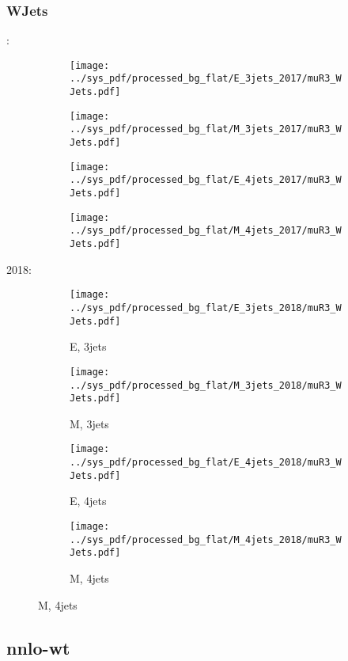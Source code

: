 \documentclass{beamer}
\begin{document}
\begin{frame}
\frametitle{WJets}
\fontsize{5}{1}:
\begin{figure}
\centering
\begin{subfigure}[b]{0.24\textwidth}
\texttt{[image: ../sys\_pdf/processed\_bg\_flat/E\_3jets\_2017/muR3\_WJets.pdf]}
\end{subfigure}
\begin{subfigure}[b]{0.24\textwidth}
\texttt{[image: ../sys\_pdf/processed\_bg\_flat/M\_3jets\_2017/muR3\_WJets.pdf]}
\end{subfigure}
\begin{subfigure}[b]{0.24\textwidth}
\texttt{[image: ../sys\_pdf/processed\_bg\_flat/E\_4jets\_2017/muR3\_WJets.pdf]}
\end{subfigure}
\begin{subfigure}[b]{0.24\textwidth}
\texttt{[image: ../sys\_pdf/processed\_bg\_flat/M\_4jets\_2017/muR3\_WJets.pdf]}
\end{subfigure}
\end{figure}
2018:
\begin{figure}
\centering
\begin{subfigure}[b]{0.24\textwidth}
\texttt{[image: ../sys\_pdf/processed\_bg\_flat/E\_3jets\_2018/muR3\_WJets.pdf]}
\captionsetup{font=tiny}
\caption{E, 3jets}
\end{subfigure}
\begin{subfigure}[b]{0.24\textwidth}
\texttt{[image: ../sys\_pdf/processed\_bg\_flat/M\_3jets\_2018/muR3\_WJets.pdf]}
\captionsetup{font=tiny}
\caption{M, 3jets}
\end{subfigure}
\begin{subfigure}[b]{0.24\textwidth}
\texttt{[image: ../sys\_pdf/processed\_bg\_flat/E\_4jets\_2018/muR3\_WJets.pdf]}
\captionsetup{font=tiny}
\caption{E, 4jets}
\end{subfigure}
\begin{subfigure}[b]{0.24\textwidth}
\texttt{[image: ../sys\_pdf/processed\_bg\_flat/M\_4jets\_2018/muR3\_WJets.pdf]}
\captionsetup{font=tiny}
\caption{M, 4jets}
\end{subfigure}
\end{figure}
\end{frame}


\subsection{nnlo-wt}
\end{document}
